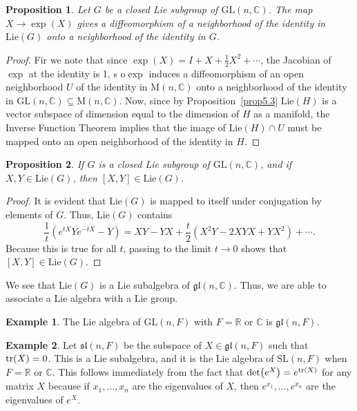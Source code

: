 \documentclass[12pt,reqno]{book}%
\newtheorem{proposition}{Proposition}[chapter]
\theoremstyle{definition}
\newtheorem{example}{Example}[chapter]
\theoremstyle{remark}
\theoremstyle{theorem}
\theoremstyle{remark}
\begin{document}
\begin{proposition}\label{prop5.4}%
    Let $G$ be a closed Lie subgroup of $\mathrm{GL}(n, \mathbb{C})$.
    The map $X \to \exp(X)$ gives a diffeomorphism of a neighborhood of the identity in $\mathrm{Lie}(G)$ onto a neighborhood of the identity in $G$.
\end{proposition}%
\begin{proof}%
    Fir we note that since $\exp(X) = I + X + \frac{1}{2} X^2 + \cdots$, the Jacobian of $\exp$ at the identity is 1, s o$\exp$ induces a diffeomorphism of an open neighborhood $U$ of the identity in $\mathrm{M}(n, \mathbb{C})$ onto a neighborhood of the identity in $\mathrm{GL}(n, \mathbb{C}) \subseteq \mathrm{M}(n, \mathbb{C})$.
    Now, since by Proposition~\ref{prop5.3} $\mathrm{Lie}(H)$ is a vector subspace of dimension equal to the dimension of $H$ as a manifold, the Inverse Function Theorem implies that the image of $\mathrm{Lie}(H) \cap U$ must be mapped onto an open neighborhood of the identity in $H$.
\end{proof}%

\begin{proposition}\label{prop5.5}%
    If $G$ is a closed Lie subgroup of $\mathrm{GL}(n, \mathbb{C})$, and if $X, Y \in \mathrm{Lie}(G)$, then $[X, Y] \in \mathrm{Lie}(G)$.
\end{proposition}%
\begin{proof}%
    It is evident that $\mathrm{Lie}(G)$ is mapped to itself under conjugation by elements of $G$.
    Thus, $\mathrm{Lie}(G)$ contains
    \[
        \frac{1}{t}(e^{tX}Ye^{-tX} - Y) = XY - YX + \frac{t}{2}(X^2Y - 2XYX + YX^2) + \cdots.
    \]
    Because this is true for all $t$, passing to the limit $t \to 0$ shows that $[X, Y] \in \mathrm{Lie}(G)$.
\end{proof}%

We see that $\mathrm{Lie}(G)$ is a Lie subalgebra of $\mathfrak{gl}(n, \mathbb{C})$.
Thus, we are able to associate a Lie algebra with a Lie group.

\begin{example}\label{}
    The Lie algebra of $\mathrm{GL}(n,F)$ with $F = \mathbb{R}$ or $\mathbb{C}$ is $\mathfrak{gl}(n,F)$.
\end{example}

\begin{example}\label{}
    Let $\mathfrak{sl}(n,F)$ be the subspace of $X \in \mathfrak{gl}(n,F)$ such that $\tr(X) = 0$.
    This is a Lie subalgebra, and it is the Lie algebra of $\mathrm{SL}(n,F)$ when $F = \mathbb{R}$ or $\mathbb{C}$.
    This follows immediately from the fact that $\det(e^X) = e^{\tr(X)}$ for any matrix $X$ because if $x_1, \ldots, x_n$ are the eigenvalues of $X$, then $e^{x_1}, \ldots, e^{x_n}$ are the eigenvalues of $e^X$.
\end{example}
\end{document}

